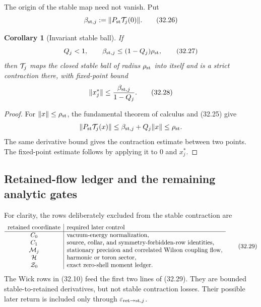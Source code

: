 \documentclass[11pt,oneside]{book}
\newtheorem{corollary}[theorem]{Corollary}
\theoremstyle{definition}
\theoremstyle{remark}
\begin{document}
The origin of the stable map need not vanish.  Put
\[
 \beta_{{\rm st},j}:=\|P_{\rm st}{\cal T}_j(0)\|.                \tag{32.26}
\]

\begin{corollary}[Invariant stable ball]
\label{cor:e8v32-invariant-ball}
If
\[
 Q_j<1,\qquad
 \beta_{{\rm st},j}\leq(1-Q_j)\rho_{\rm st},                    \tag{32.27}
\]
then \({\cal T}_j\) maps the closed stable ball of radius
\(\rho_{\rm st}\) into itself and is a strict contraction there,
with fixed-point bound
\[
 \|x_j^\ast\|\leq\frac{\beta_{{\rm st},j}}{1-Q_j}.               \tag{32.28}
\]
\end{corollary}

\begin{proof}
For \(\|x\|\leq\rho_{\rm st}\), the fundamental theorem of calculus
and (32.25) give
\[
 \|P_{\rm st}{\cal T}_j(x)\|
 \leq\beta_{{\rm st},j}+Q_j\|x\|
 \leq\rho_{\rm st}.
\]
The same derivative bound gives the contraction estimate between two
points.  The fixed-point estimate follows by applying it to \(0\) and
\(x_j^\ast\).
\end{proof}

\subsection{Retained-flow ledger and the remaining analytic gates}

For clarity, the rows deliberately excluded from the stable
contraction are
\[
\begin{array}{c|l}
\text{retained coordinate}&\text{required later control}\\ \hline
C_0&\text{vacuum-energy normalization},\\
C_1&\text{source, collar, and symmetry-forbidden-row identities},\\
{\cal M}_j&\text{stationary precision and correlated Wilson coupling flow},\\
{\cal H}&\text{harmonic or toron sector},\\
{\cal Z}_0&\text{exact zero-shell moment ledger}.
\end{array}                                                       \tag{32.29}
\]
The Wick rows in (32.10) feed the first two lines of (32.29).
They are bounded stable-to-retained derivatives, but not stable
contraction losses.  Their possible later return is included only
through
\(\varepsilon_{{\rm ret}\to{\rm st},j}\).
\end{document}
